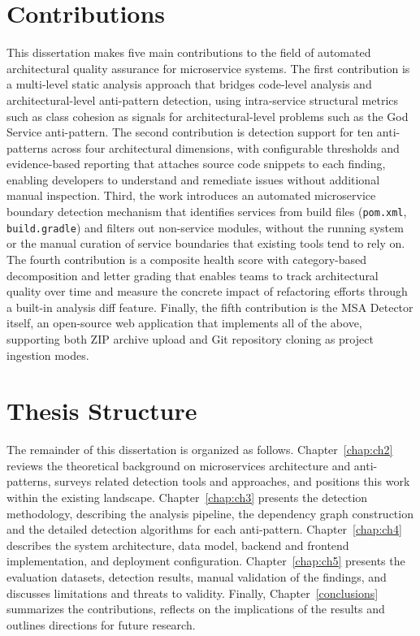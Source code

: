 \section{Contributions}
\label{sec:contributions}

\par This dissertation makes five main contributions to the field of automated architectural quality assurance for microservice systems. The first contribution is a multi-level static analysis approach that bridges code-level analysis and architectural-level anti-pattern detection, using intra-service structural metrics such as class cohesion as signals for architectural-level problems such as the God Service anti-pattern. The second contribution is detection support for ten anti-patterns across four architectural dimensions, with configurable thresholds and evidence-based reporting that attaches source code snippets to each finding, enabling developers to understand and remediate issues without additional manual inspection. Third, the work introduces an automated microservice boundary detection mechanism that identifies services from build files (\texttt{pom.xml}, \texttt{build.gradle}) and filters out non-service modules, without the running system or the manual curation of service boundaries that existing tools tend to rely on. The fourth contribution is a composite health score with category-based decomposition and letter grading that enables teams to track architectural quality over time and measure the concrete impact of refactoring efforts through a built-in analysis diff feature. Finally, the fifth contribution is the MSA Detector itself, an open-source web application that implements all of the above, supporting both ZIP archive upload and Git repository cloning as project ingestion modes.

\section{Thesis Structure}
\label{sec:thesis-structure}

\par The remainder of this dissertation is organized as follows. Chapter~\ref{chap:ch2} reviews the theoretical background on microservices architecture and anti-patterns, surveys related detection tools and approaches, and positions this work within the existing landscape. Chapter~\ref{chap:ch3} presents the detection methodology, describing the analysis pipeline, the dependency graph construction and the detailed detection algorithms for each anti-pattern. Chapter~\ref{chap:ch4} describes the system architecture, data model, backend and frontend implementation, and deployment configuration. Chapter~\ref{chap:ch5} presents the evaluation datasets, detection results, manual validation of the findings, and discusses limitations and threats to validity. Finally, Chapter~\ref{conclusions} summarizes the contributions, reflects on the implications of the results and outlines directions for future research.

